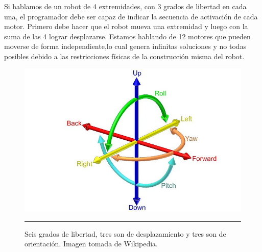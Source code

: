 Si hablamos de un robot de 4 extremidades, con 3 grados de libertad en cada una, el programador debe ser capaz de indicar la secuencia de activación de cada motor. Primero debe hacer que el robot mueva una extremidad y luego con la suma de las 4 lograr desplazarse. Estamos hablando de 12 motores que pueden moverse de forma independiente,lo cual genera infinitas soluciones y no todas posibles debido a las restricciones físicas de la construcción misma del robot.

\begin{figure}[htbp]
	\centering
		\includegraphics[width=\textwidth]{./Figures/6DOF.jpg}
		\rule{35em}{0.5pt}
	\caption[Grados de libertad]{Seis grados de libertad, tres son de desplazamiento y tres son de orientación. Imagen tomada de Wikipedia.}
	\label{fig:grados de libertad}
\end{figure}



